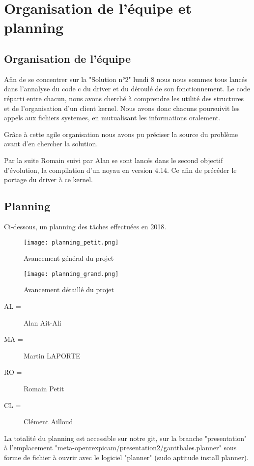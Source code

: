 
\chapter{Organisation de l'équipe et planning} %

\label{Chapter1} %


\section{Organisation de l'équipe}

Afin de se concentrer sur la "Solution n°2" lundi 8 nous nous sommes tous lancés dans
l'annalyse du code c du driver et du déroulé de son fonctionnement. Le code réparti
entre chacun, nous avons cherché à comprendre les utilité des structures et de
l'organisation d'un client kernel. Nous avons donc chacuns poursuivit les appels
aux fichiers systemes, en mutualisant les informations oralement.

Grâce à cette agile organisation nous avons pu préciser la source du problème
avant d'en chercher la solution.

Par la suite Romain suivi par Alan se sont lancés dans le second objectif
d'évolution, la compilation d'un noyau en version 4.14. Ce afin de précéder le
portage du driver à ce kernel.

\section{Planning}

Ci-dessous, un planning des tâches effectuées en 2018.

\begin{figure}[th]
    \centering
    \texttt{[image: planning\_petit.png]}
    \decoRule
    \caption{Avancement général du projet}
    \label{fig:planning}
\end{figure}
\begin{figure}[th]
    \centering
    \texttt{[image: planning\_grand.png]}
    \decoRule
    \caption{Avancement détaillé du projet}
    \label{fig:planning}
\end{figure}

\begin{description}
  \item[AL =] Alan Ait-Ali
  \item[MA =] Martin LAPORTE
  \item[RO =]  Romain Petit
  \item[CL =] Clément Ailloud
\end{description}

La totalité du planning est accessible sur notre git, sur la branche "presentation"
à l'emplacement "meta-openrexpicam/presentation2/gantthales.planner" sous forme
de fichier à ouvrir avec le logiciel "planner" (sudo aptitude install planner).

